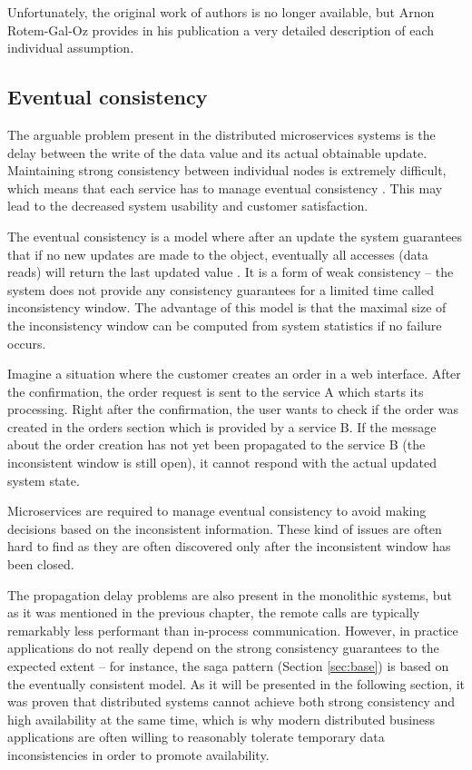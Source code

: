 \documentclass[oneside,
  digital, %
  table,   %
  lof,     %
  lot,     %
]{fithesis3}
\begin{document}
\noindent
Unfortunately, the original work of authors is no longer available, but Arnon Rotem-Gal-Oz provides in his publication \cite{fallacies} a very detailed description of each individual assumption.

\subsection{Eventual consistency}
\label{sec:eventual-consistency}

The arguable problem present in the distributed microservices systems is the delay between the write of the data value and its actual obtainable update. Maintaining strong consistency between individual nodes is extremely difficult, which means that each service has to manage eventual consistency \cite{ms_tradeoffs}. This may lead to the decreased system usability and customer satisfaction.

The eventual consistency is a model where after an update the system guarantees that if no new updates are made to the object, eventually all accesses (data reads) will return the last updated value \cite{event_consist}. It is a form of weak consistency -- the system does not provide any consistency guarantees for a limited time called inconsistency window. The advantage of this model is that the maximal size of the inconsistency window can be computed from system statistics if no failure occurs.

Imagine a situation where the customer creates an order in a web interface. After the confirmation, the order request is sent to the service A which starts its processing. Right after the confirmation, the user wants to check if the order was created in the orders section which is provided by a service B. If the message about the order creation has not yet been propagated to the service B (the inconsistent window is still open), it cannot respond with the actual updated system state. 

Microservices are required to manage eventual consistency to avoid making decisions based on the inconsistent information. These kind of issues are often hard to find as they are often discovered only after the inconsistent window has been closed.

The propagation delay problems are also present in the monolithic systems, but as it was mentioned in the previous chapter, the remote calls are typically remarkably less performant than in-process communication. However, in practice applications do not really depend on the strong consistency guarantees to the expected extent -- for instance, the saga pattern (Section \ref{sec:base}) is based on the eventually consistent model. As it will be presented in the following section, it was proven that distributed systems cannot achieve both strong consistency and high availability at the same time, which is why modern distributed business applications are often willing to reasonably tolerate temporary data inconsistencies in order to promote availability.
\end{document}
